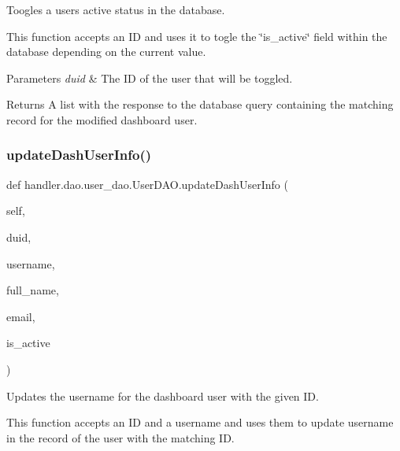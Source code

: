 Toogles a user\textquotesingle{}s active status in the database. 

This function accepts an ID and uses it to togle the \char`\"{}is\+\_\+active\char`\"{} field within the database depending on the current value.


\begin{DoxyParams}{Parameters}
{\em duid} & The ID of the user that will be toggled.\\
\hline
\end{DoxyParams}
\begin{DoxyReturn}{Returns}
A list with the response to the database query containing the matching record for the modified dashboard user. 
\end{DoxyReturn}
\mbox{\label{classhandler_1_1dao_1_1user__dao_1_1_user_d_a_o_aecd7d28a6180b613a29020d8a36aa49d}} 
\subsubsection{\texorpdfstring{update\+Dash\+User\+Info()}{updateDashUserInfo()}}
{\footnotesize\ttfamily def handler.\+dao.\+user\+\_\+dao.\+User\+D\+A\+O.\+update\+Dash\+User\+Info (\begin{DoxyParamCaption}\item[{}]{self,  }\item[{}]{duid,  }\item[{}]{username,  }\item[{}]{full\+\_\+name,  }\item[{}]{email,  }\item[{}]{is\+\_\+active }\end{DoxyParamCaption})}



Updates the username for the dashboard user with the given ID. 

This function accepts an ID and a username and uses them to update username in the record of the user with the matching ID.


